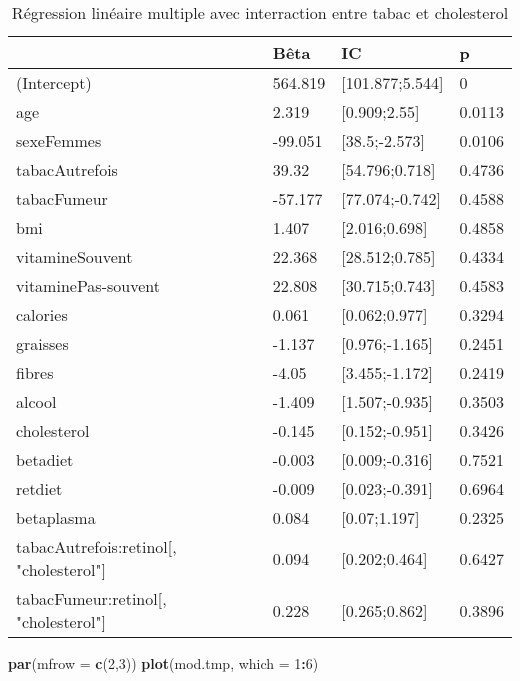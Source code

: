 \documentclass[]{article}
\newenvironment{Shaded}{\begin{snugshade}}{\end{snugshade}}
\newcommand{\KeywordTok}[1]{\textcolor[rgb]{0.13,0.29,0.53}{\textbf{#1}}}
\newcommand{\DataTypeTok}[1]{\textcolor[rgb]{0.13,0.29,0.53}{#1}}
\newcommand{\DecValTok}[1]{\textcolor[rgb]{0.00,0.00,0.81}{#1}}
\newcommand{\OperatorTok}[1]{\textcolor[rgb]{0.81,0.36,0.00}{\textbf{#1}}}
\newcommand{\NormalTok}[1]{#1}
\begin{document}
\begin{table}

\caption{\label{tab:unnamed-chunk-71}Régression linéaire multiple avec interraction entre tabac et cholesterol}
\centering
\begin{tabular}[t]{l|l|l|l}
\hline
  & Bêta & IC & p\\
\hline
\rowcolor[HTML]{BBD2E1}  (Intercept) & 564.819 & [101.877;5.544] & 0\\
\hline
age & 2.319 & [0.909;2.55] & 0.0113\\
\hline
\rowcolor[HTML]{BBD2E1}  sexeFemmes & -99.051 & [38.5;-2.573] & 0.0106\\
\hline
tabacAutrefois & 39.32 & [54.796;0.718] & 0.4736\\
\hline
\rowcolor[HTML]{BBD2E1}  tabacFumeur & -57.177 & [77.074;-0.742] & 0.4588\\
\hline
bmi & 1.407 & [2.016;0.698] & 0.4858\\
\hline
\rowcolor[HTML]{BBD2E1}  vitamineSouvent & 22.368 & [28.512;0.785] & 0.4334\\
\hline
vitaminePas-souvent & 22.808 & [30.715;0.743] & 0.4583\\
\hline
\rowcolor[HTML]{BBD2E1}  calories & 0.061 & [0.062;0.977] & 0.3294\\
\hline
graisses & -1.137 & [0.976;-1.165] & 0.2451\\
\hline
\rowcolor[HTML]{BBD2E1}  fibres & -4.05 & [3.455;-1.172] & 0.2419\\
\hline
alcool & -1.409 & [1.507;-0.935] & 0.3503\\
\hline
\rowcolor[HTML]{BBD2E1}  cholesterol & -0.145 & [0.152;-0.951] & 0.3426\\
\hline
betadiet & -0.003 & [0.009;-0.316] & 0.7521\\
\hline
\rowcolor[HTML]{BBD2E1}  retdiet & -0.009 & [0.023;-0.391] & 0.6964\\
\hline
betaplasma & 0.084 & [0.07;1.197] & 0.2325\\
\hline
\rowcolor[HTML]{BBD2E1}  tabacAutrefois:retinol[, "cholesterol"] & 0.094 & [0.202;0.464] & 0.6427\\
\hline
tabacFumeur:retinol[, "cholesterol"] & 0.228 & [0.265;0.862] & 0.3896\\
\hline
\end{tabular}
\end{table}

\begin{Shaded}
\begin{Highlighting}[]
\KeywordTok{par}\NormalTok{(}\DataTypeTok{mfrow =} \KeywordTok{c}\NormalTok{(}\DecValTok{2}\NormalTok{,}\DecValTok{3}\NormalTok{))}
\KeywordTok{plot}\NormalTok{(mod.tmp, }\DataTypeTok{which =} \DecValTok{1}\OperatorTok{:}\DecValTok{6}\NormalTok{)}
\end{Highlighting}
\end{Shaded}
\end{document}
